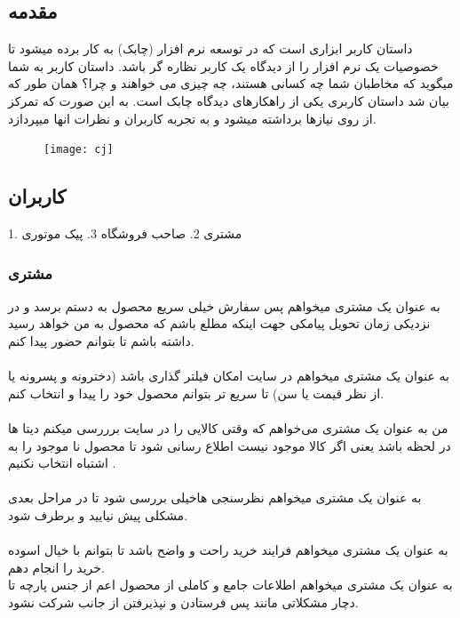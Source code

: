 \documentclass[12pt,onecolumn,a4paper]{article}
\begin{document}
\subsection{مقدمه}
داستان کاربر ابزاری است که در توسعه نرم افزار (چابک) به کار برده میشود تا خصوصیات یک نرم افزار را از دیدگاه یک کاربر نظاره گر باشد. داستان کاربر به شما میگوید که مخاطبان شما چه کسانی هستند، چه چیزی می خواهند و چرا؟
همان طور که بیان شد داستان کاربری یکی از راهکارهای دیدگاه چابک است. به این صورت که تمرکز از روی نیازها برداشته میشود و به تجربه کاربران و نظرات انها میپردازد.\\
\begin{figure}[h]

\texttt{[image: cj]}
\end{figure}

\subsection{ کاربران }
 1. مشتری 2. صاحب فروشگاه 3. پیک موتوری

\subsubsection{ مشتری }

به عنوان یک مشتری میخواهم پس سفارش خیلی سریع محصول به دستم برسد و در نزدیکی زمان تحویل  پیامکی جهت اینکه مطلع باشم که محصول به من خواهد رسید داشته باشم تا بتوانم حضور پیدا کنم.\\
\\
	

به عنوان یک مشتری میخواهم در سایت امکان فیلتر گذاری باشد (دخترونه و پسرونه یا از نظر قیمت یا سن) تا سریع تر بتوانم محصول خود را پیدا و انتخاب کنم.\\
\\


من به عنوان یک مشتری می‌خواهم که وقتی کالایی را در سایت برررسی میکنم دیتا ها   در لحظه باشد یعنی اگر کالا موجود نیست اطلاع رسانی شود تا محصول نا موجود را به اشتباه انتخاب نکنیم .\\
\\


به عنوان یک مشتری میخواهم نظرسنجی هاخیلی بررسی شود تا در مراحل بعدی مشکلی پیش نیایید و برطرف شود.\\
\\


به عنوان یک مشتری میخواهم فرایند خرید راحت و واضح باشد تا بتوانم با خیال اسوده خرید را انجام دهم.\\


به عنوان یک مشتری میخواهم اطلاعات جامع و کاملی از محصول اعم از جنس پارچه تا دچار مشکلاتی مانند پس فرستادن و نپذیرفتن از جانب شرکت نشود.\\
\\
\end{document}
